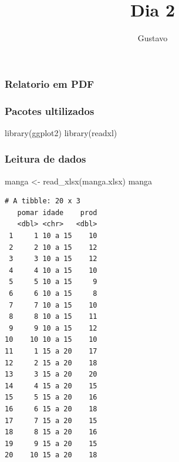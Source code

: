 \documentclass[
  letterpaper,
  DIV=11,
  numbers=noendperiod]{scrartcl}
\title{Dia 2}
\author{Gustavo}
\date{}
\newenvironment{Shaded}{\begin{snugshade}}{\end{snugshade}}
\newcommand{\FunctionTok}[1]{\textcolor[rgb]{0.28,0.35,0.67}{#1}}
\newcommand{\NormalTok}[1]{\textcolor[rgb]{0.00,0.23,0.31}{#1}}
\newcommand{\OtherTok}[1]{\textcolor[rgb]{0.00,0.23,0.31}{#1}}
\newcommand{\StringTok}[1]{\textcolor[rgb]{0.13,0.47,0.30}{#1}}
\begin{document}
\maketitle

\subsection{}\label{section}

\subsubsection{Relatorio em PDF}\label{relatorio-em-pdf}

\subsubsection{Pacotes ultilizados}\label{pacotes-ultilizados}

\begin{Shaded}
\begin{Highlighting}[]
\FunctionTok{library}\NormalTok{(ggplot2)}
\FunctionTok{library}\NormalTok{(readxl)}
\end{Highlighting}
\end{Shaded}

\subsubsection{Leitura de dados}\label{leitura-de-dados}

\begin{Shaded}
\begin{Highlighting}[]
\NormalTok{manga }\OtherTok{\textless{}{-}} \FunctionTok{read\_xlsx}\NormalTok{(}\StringTok{\textquotesingle{}manga.xlsx\textquotesingle{}}\NormalTok{)}
\NormalTok{manga}
\end{Highlighting}
\end{Shaded}

\begin{verbatim}
# A tibble: 20 x 3
   pomar idade    prod
   <dbl> <chr>   <dbl>
 1     1 10 a 15    10
 2     2 10 a 15    12
 3     3 10 a 15    12
 4     4 10 a 15    10
 5     5 10 a 15     9
 6     6 10 a 15     8
 7     7 10 a 15    10
 8     8 10 a 15    11
 9     9 10 a 15    12
10    10 10 a 15    10
11     1 15 a 20    17
12     2 15 a 20    18
13     3 15 a 20    20
14     4 15 a 20    15
15     5 15 a 20    16
16     6 15 a 20    18
17     7 15 a 20    15
18     8 15 a 20    16
19     9 15 a 20    15
20    10 15 a 20    18
\end{verbatim}
\end{document}
